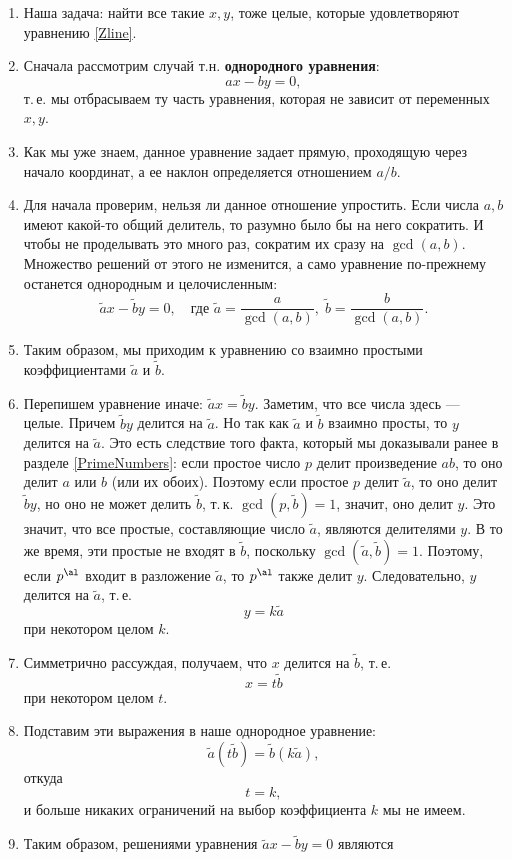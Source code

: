 \begin{enumerate}
\item Наша задача: найти все такие $x,y$, тоже целые, которые удовлетворяют уравнению \eqref{Zline}.
\item Сначала рассмотрим случай т.н. \textbf{однородного уравнения}:
$$
ax-by=0,
$$
т.\,е. мы отбрасываем ту часть уравнения, которая не зависит от переменных $x,y$.
\item Как мы уже знаем, данное уравнение задает прямую, проходящую через начало координат, а ее наклон определяется отношением $a/b$.
\item Для начала проверим, нельзя ли данное отношение упростить. Если числа $a,b$ имеют какой-то общий делитель, то разумно было бы на него сократить. И чтобы не проделывать это много раз, сократим их сразу на $\gcd(a,b)$. Множество решений от этого не изменится, а само уравнение по-прежнему останется однородным и целочисленным:
$$
\tilde ax-\tilde by=0,\quad\mbox{где } \tilde a=\frac{a}{\gcd(a,b)},\;\tilde b=\frac{b}{\gcd(a,b)}.
$$
\item Таким образом, мы приходим к уравнению со взаимно простыми коэффициентами $\tilde a$ и $\tilde b$.
\item Перепишем уравнение иначе: $\tilde ax=\tilde by$. Заметим, что все числа здесь --- целые. Причем $\tilde by$ делится на $\tilde a$. Но так как $\tilde a$ и $\tilde b$ взаимно просты, то $y$ делится на $\tilde a$. Это есть следствие того факта, который мы доказывали ранее в разделе \ref{PrimeNumbers}: если простое число $p$ делит произведение $ab$, то оно делит $a$ или $b$ (или их обоих). Поэтому если простое $p$ делит $\tilde a$, то оно делит $\tilde by$, но оно не может делить $\tilde b$, т.\,к. $\gcd(p,\tilde b)=1$, значит, оно делит $y$. Это значит, что все простые, составляющие число $\tilde a$, являются делителями $y$. В то же время, эти простые не входят в $\tilde b$, поскольку $\gcd(\tilde a,\tilde b)=1$. Поэтому, если $p^\al$ входит в разложение $\tilde a$, то $p^\al$ также делит $y$. Следовательно, $y$ делится на $\tilde a$, т.\,е. 
$$
y=k\tilde a
$$
при некотором целом $k$.
\item Симметрично рассуждая, получаем, что $x$ делится на $\tilde b$, т.\,е.
$$
x=t\tilde b
$$
при некотором целом $t$.
\item Подставим эти выражения в наше однородное уравнение:
$$
\tilde a(t\tilde b)=\tilde b(k\tilde a),
$$
откуда
$$
t=k,
$$
и больше никаких ограничений на выбор коэффициента $k$ мы не имеем.
\item Таким образом, решениями уравнения $\tilde ax-\tilde by=0$ являются

\end{enumerate}
